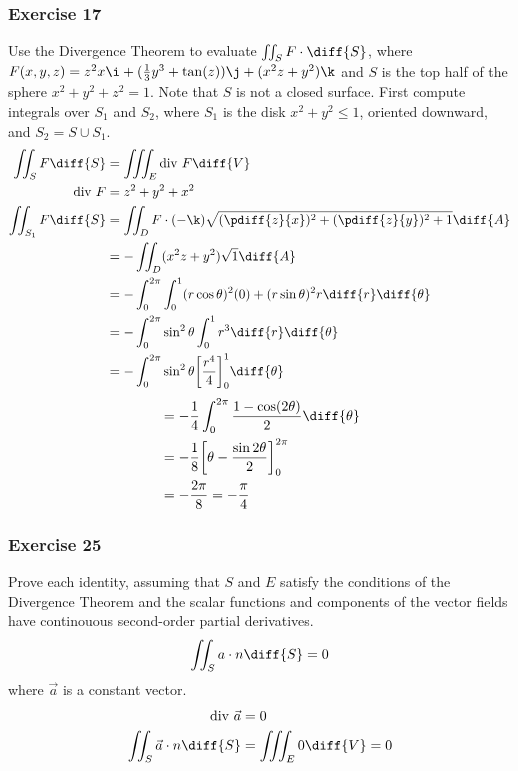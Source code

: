 \documentclass{math}
\begin{document}
\subsubsection*{Exercise 17}
Use the Divergence Theorem to evaluate \( \iint_{S}F\cdot\diff{S} \), where
\( F(x,y,z) = z^2x\i+(\frac{1}{3}y^3+\tan(z))\j+(x^2z+y^2)\k \) and \( S \) is
the top half of the sphere \( x^2+y^2+z^2 = 1 \). Note that \( S \) is not a
closed surface. First compute integrals over \( S_1 \) and \( S_2 \), where
\( S_1 \) is the disk \( x^2+y^2\le1 \), oriented downward, and
\( S_2 = S\cup S_1 \).
\begin{align*}
  \iint_{S}F\diff{S} &= \iiint_{E}\text{div}~F\diff{V} \\
  \text{div}~F &= z^2+y^2+x^2 \\
  \iint_{S_1}F\diff{S} &=
    \iint_{D}F\cdot(-\k)\sqrt{(\pdiff{z}{x})^2+(\pdiff{z}{y})^2+1}\diff{A} \\
  &= -\iint_{D}(x^2z+y^2)\sqrt{1}\diff{A} \\
  &= -\int_{0}^{2\pi}\int_{0}^{1}(r\cos\theta)^2(0)+(r\sin\theta)^2r
    \diff{r}\diff{\theta} \\
  &= -\int_{0}^{2\pi}\sin^2\theta\int_{0}^{1}r^3\diff{r}\diff{\theta} \\
  &= -\int_{0}^{2\pi}\sin^2\theta\bigg[\frac{r^4}{4}\bigg]_{0}^{1}
    \diff{\theta}
\end{align*}
\begin{align*}
  &= -\frac{1}{4}\int_{0}^{2\pi}\frac{1-\cos(2\theta)}{2}\diff{\theta} \\
  &= -\frac{1}{8}\bigg[\theta-\frac{\sin2\theta}{2}\bigg]_{0}^{2\pi} \\
  &= -\frac{2\pi}{8} = -\frac{\pi}{4}
\end{align*}

\subsubsection*{Exercise 25}
Prove each identity, assuming that \( S \) and \( E \) satisfy the conditions of
the Divergence Theorem and the scalar functions and components of the vector
fields have continouous second-order partial derivatives.
\[ \iint_{S}a\cdot n\diff{S} = 0 \]
where \( \vec{a} \) is a constant vector.
\begin{align*}
  \text{div}~\vec{a} &= 0 \\
  \iint_{S}\vec{a}\cdot n\diff{S} &= \iiint_{E}0\diff{V} = 0
\end{align*}
\end{document}
